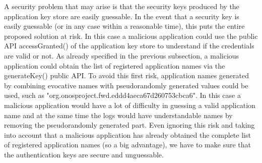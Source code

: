 A security problem that may arise is that the security keys produced by the application key store are easily guessable. In the event that a security key is easily guessable (or in any case within a reasonable time), this puts the entire proposed solution at risk. In this case a malicious application could use the public API accessGranted() of the application key store to understand if the credentials are valid or not. As already specified in the previous subsection, a malicious application could obtain the list of registered application names via the generateKey() public API. To avoid this first risk, application names generated by combining evocative names with pseudorandomly generated values could be used, such as "org.onosproject.fwd.eddd4aeca67d260753cbca6". In this case a malicious application would have a lot of difficulty in guessing a valid application name and at the same time the logs would have understandable names by removing the pseudorandomly generated part. Even ignoring this risk and taking into account that a malicious application has already obtained the complete list of registered application names (so a big advantage), we have to make sure that the authentication keys are secure and unguessable.
\medskip

